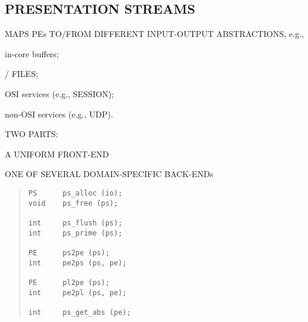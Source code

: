\begin{bwslide}
\part*	{PRESENTATION STREAMS}\bf

\begin{nrtc}
\item	MAPS PEs TO/FROM DIFFERENT INPUT-OUTPUT ABSTRACTIONS, e.g.,
    \begin{nrtc}
    \item	in-core buffers;

    \item	\unix/ FILES;

    \item	OSI services (e.g., SESSION);

    \item	non-OSI services (e.g., UDP).
    \end{nrtc}

\item	TWO PARTS:
    \begin{nrtc}
    \item	A UNIFORM FRONT-END

    \item	ONE OF SEVERAL DOMAIN-SPECIFIC BACK-ENDs
    \end{nrtc}
\end{nrtc}
\end{bwslide}


\begin{bwslide}

\begin{quote}\small\begin{verbatim}
PS      ps_alloc (io);
void    ps_free (ps);

int     ps_flush (ps);
int     ps_prime (ps);

PE      ps2pe (ps);
int     pe2ps (ps, pe);

PE      pl2pe (ps);
int     pe2pl (ps, pe);

int     ps_get_abs (pe);
\end{verbatim}\end{quote}
\end{bwslide}


